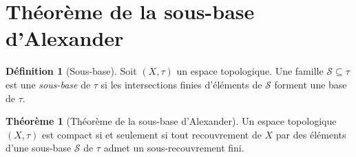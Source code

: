 \documentclass[12pt,a4paper,openany]{book}
\theoremstyle{definition}
\newtheorem{definition}{Définition}[chapter]
\theoremstyle{cours}
\newtheorem{theoreme}{Théorème}[chapter]
\theoremstyle{coursnormal}
\begin{document}
\section{Théorème de la sous-base d'Alexander}\label{sec:alexander}

\begin{definition}[Sous-base]\label{def:sous-base-rappel}
  Soit $(X,\tau)$ un espace topologique. Une famille
  $\mathcal{S}\subseteq\tau$ est une \emph{sous-base} de $\tau$ si les
  intersections finies d'éléments de $\mathcal{S}$ forment une base de $\tau$.
\end{definition}

\begin{theoreme}[Théorème de la sous-base d'Alexander]\label{thm:alexander}
  Un espace topologique $(X,\tau)$ est compact si et seulement si tout
  recouvrement de $X$ par des éléments d'une sous-base $\mathcal{S}$
  de $\tau$ admet un sous-recouvrement fini.
\end{theoreme}
\end{document}
